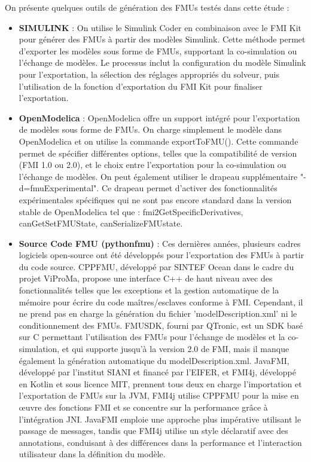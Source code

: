   On présente quelques outils de génération des FMUs testés dans cette étude : 
  \begin{itemize}
    \item \textbf{SIMULINK} :  On utilise le Simulink Coder en combinaison avec le FMI Kit pour générer des FMUs à partir des modèles Simulink. Cette méthode permet d'exporter les modèles sous forme de FMUs, supportant la co-simulation ou l'échange de modèles. Le processus inclut la configuration du modèle Simulink pour l'exportation, la sélection des réglages appropriés du solveur, puis l'utilisation de la fonction d'exportation du FMI Kit pour finaliser l'exportation.
    \item \textbf{OpenModelica} : OpenModelica offre un support intégré pour l'exportation de modèles sous forme de FMUs. On charge simplement le modèle dans OpenModelica et on utilise la commande exportToFMU(). Cette commande permet de spécifier différentes options, telles que la compatibilité de version (FMI 1.0 ou 2.0), et le choix entre l'exportation pour la co-simulation ou l'échange de modèles. On peut également utiliser le drapeau supplémentaire "-d=fmuExperimental". Ce drapeau permet d'activer des fonctionnalités expérimentales spécifiques qui ne sont pas encore standard dans la version stable de OpenModelica tel que : fmi2GetSpecificDerivatives, canGetSetFMUState, canSerializeFMUstate.
    \item \textbf{Source Code FMU (pythonfmu)} : Ces dernières années, plusieurs cadres logiciels open-source ont été développés pour l'exportation des FMUs à partir du code source. CPPFMU, développé par SINTEF Ocean dans le cadre du projet ViProMa, propose une interface C++ de haut niveau avec des fonctionnalités telles que les exceptions et la gestion automatique de la mémoire pour écrire du code maîtres/esclaves conforme à FMI. Cependant, il ne prend pas en charge la génération du fichier 'modelDescription.xml' ni le conditionnement des FMUs. FMUSDK, fourni par QTronic, est un SDK basé sur C permettant l'utilisation des FMUs pour l'échange de modèles et la co-simulation, et qui supporte jusqu'à la version 2.0 de FMI, mais il manque également la génération automatique du modelDescription.xml. JavaFMI, développé par l'institut SIANI et financé par l'EIFER, et FMI4j, développé en Kotlin et sous licence MIT, prennent tous deux en charge l'importation et l'exportation de FMUs sur la JVM, FMI4j utilise CPPFMU pour la mise en œuvre des fonctions FMI et se concentre sur la performance grâce à l'intégration JNI. JavaFMI emploie une approche plus impérative utilisant le passage de messages, tandis que FMI4j utilise un style déclaratif avec des annotations, conduisant à des différences dans la performance et l'interaction utilisateur dans la définition du modèle.

\end{itemize}
